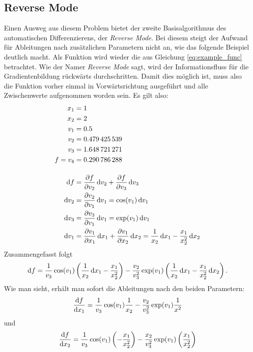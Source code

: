 \documentclass{scrartcl}
\begin{document}
\subsection{Reverse Mode}
Einen Ausweg aus diesem Problem bietet der zweite Basisalgorithmus des automatischen Differenzierens, der \emph{Reverse Mode}. Bei diesem steigt der Aufwand für Ableitungen nach zusätzlichen Parametern nicht an, wie das folgende Beispiel deutlich macht. Als Funktion wird wieder die aus Gleichung \ref{eq:example_func} betrachtet. Wie der Namer \emph{Reverse Mode} sagt, wird der Informationsfluss für die Gradientenbildung rückwärts durchschritten. Damit dies möglich ist, muss also die Funktion vorher einmal in Vorwärtsrichtung ausgeführt und alle Zwischenwerte aufgenommen worden sein. Es gilt also:
\begin{equation*}
	\begin{aligned}
		x_1 &= 1 \\
		x_2 &= 2 \\
		v_1 &= \num{0,5} \\
		v_2 &= \num{0.479425539}\\
		v_3 &= \num{1.648721271}\\
		f = v_4 &= \num{0.290786288}\\[0.4cm]
		
		\dif f &= \frac{\partial f}{\partial v_2} \dif v_2 +  \frac{\partial f}{\partial v_3} \dif v_3 \\
		\dif v_2 &= \frac{\partial v_2}{\partial v_1} \dif v_1 = \cos(v_1) \dif v_1 \\
		\dif v_3 &= \frac{\partial v_3}{\partial v_1} \dif v_1 = \exp(v_1) \dif v_1 \\
		\dif v_1 &= \frac{\partial v_1}{\partial x_1} \dif x_1 + \frac{\partial v_1}{\partial x_2} \dif x_2 = \frac{1}{x_2} \dif x_1 - \frac{x_1}{x_2^2} \dif x_2
	\end{aligned}
\end{equation*}
Zusammengefasst folgt
\begin{equation}
	\mathop{}\!\mathrm{d} f = \frac{1}{v_3}\cos(v_1)\left(\frac{1}{x_2} \mathop{}\!\mathrm{d} x_1 - \frac{x_1}{x_2^2}\right) - \frac{v_2}{v_3^2}\exp(v_1)\left(\frac{1}{x_2}\mathop{}\!\mathrm{d} x_1 - \frac{x_1}{x_2^2}\mathop{}\!\mathrm{d} x_2\right).
\end{equation}
Wie man sieht, erhält man sofort die Ableitungen nach den beiden Parametern:
\begin{equation}
	\frac{\mathop{}\!\mathrm{d} f}{\mathop{}\!\mathrm{d} x_1} = \frac{1}{v_3}\cos(v_1)\frac{1}{x_2} - \frac{v_2}{v_3^2}\exp(v_1)\frac{1}{x^2}
\end{equation}
und
\begin{equation}
	\frac{\mathop{}\!\mathrm{d} f}{\mathop{}\!\mathrm{d} x_2} = \frac{1}{v_3}\cos(v_1)\left(-\frac{x_1}{x_2^2}\right) - \frac{x_2}{v_3^2}\exp(v_1)\left(\frac{x_1}{x_2^2}\right)
\end{equation}
\newpage
\printbibliography
\end{document}
